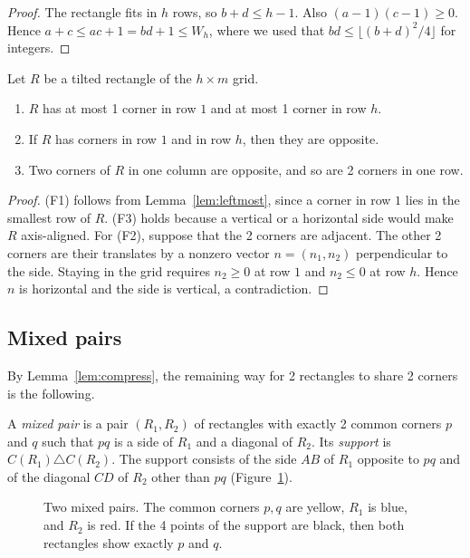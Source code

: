 \begin{proof}
The rectangle fits in $h$ rows, so $b+d\le h-1$. Also $(a-1)(c-1)\ge0$. Hence
$a+c\le ac+1=bd+1\le W_h$, where we used that $bd\le\lfloor(b+d)^2/4\rfloor$ for integers.
\end{proof}

\begin{lemma}\label{lem:facts}
Let $R$ be a tilted rectangle of the $h\times m$ grid.
\begin{enumerate}[(F1)]
\item $R$ has at most 1 corner in row $1$ and at most 1 corner in row $h$.
\item If $R$ has corners in row $1$ and in row $h$, then they are opposite.
\item Two corners of $R$ in one column are opposite, and so are 2 corners in one row.
\end{enumerate}
\end{lemma}

\begin{proof}
(F1) follows from Lemma~\ref{lem:leftmost}, since a corner in row $1$ lies in the smallest
row of $R$. (F3) holds because a vertical or a horizontal side would make $R$
axis-aligned. For (F2), suppose that the 2 corners are adjacent. The other 2 corners are
their translates by a nonzero vector $n=(n_1,n_2)$ perpendicular to the side. Staying in
the grid requires $n_2\ge0$ at row $1$ and $n_2\le0$ at row $h$. Hence $n$ is horizontal
and the side is vertical, a contradiction.
\end{proof}

\subsection{Mixed pairs}

By Lemma~\ref{lem:compress}, the remaining way for 2 rectangles to share 2 corners is the
following.

\begin{definition}\label{def:mixed}
A \emph{mixed pair} is a pair $(R_1,R_2)$ of rectangles with exactly 2 common corners $p$
and $q$ such that $pq$ is a side of $R_1$ and a diagonal of $R_2$. Its \emph{support} is
$C(R_1)\triangle C(R_2)$. The support consists of the side $AB$ of $R_1$ opposite to $pq$
and of the diagonal $CD$ of $R_2$ other than $pq$ (Figure~\ref{fig:mixed}).
\end{definition}

\begin{figure}[ht]
\centering

\caption{Two mixed pairs. The common corners $p,q$ are yellow, $R_1$ is blue, and $R_2$ is
red. If the 4 points of the support are black, then both rectangles show exactly $p$
and $q$.}
\label{fig:mixed}
\end{figure}

